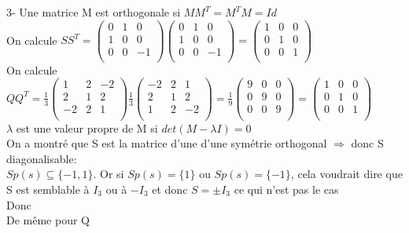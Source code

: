 \documentclass{article}
\begin{document}
3- Une matrice M est orthogonale si $MM^T = M^TM = Id$\\
On calcule $SS^T = \begin{pmatrix}
    0 & 1 & 0\\
    1 & 0 & 0\\
    0 & 0 & -1\\
\end{pmatrix}\begin{pmatrix}
    0 & 1 & 0\\
    1 & 0 & 0\\
    0 & 0 & -1\\
\end{pmatrix} = \begin{pmatrix}
    1 & 0 & 0\\
    0 & 1 & 0\\
    0 & 0 & 1\\
\end{pmatrix}$\vspace{3mm}\\
On calcule $QQ^T = \frac{1}{3}\begin{pmatrix}
    1 & 2 & -2\\
    2 & 1 & 2\\
    -2 & 2 & 1\\
\end{pmatrix}\frac{1}{3} \begin{pmatrix}
    -2 & 2 & 1\\
    2 & 1 & 2\\
    1 & 2 & -2\\
\end{pmatrix} = \frac{1}{9} \begin{pmatrix}
    9 & 0 & 0\\
    0 & 9 & 0\\
    0 & 0 & 9\\
\end{pmatrix} =\begin{pmatrix}
    1 & 0 & 0\\
    0 & 1 & 0\\
    0 & 0 & 1\\
\end{pmatrix}$\vspace{3mm}\\
$\lambda$ est une valeur propre de M si $det(M - \lambda I) = 0$\\
On a montré que S est la matrice d'une d'une symétrie orthogonal $\Rightarrow$ donc S diagonalisable:\\
$Sp(s) \subseteq \{-1, 1\}$. Or si $Sp(s) = \{1\}$ ou $Sp(s) = \{-1\}$, cela voudrait dire que S est semblable à $I_3$ ou à $-I_3$ et donc $S = \pm I_3$ ce qui n'est pas le cas\\
Donc \\
De même pour Q \\
\end{document}
